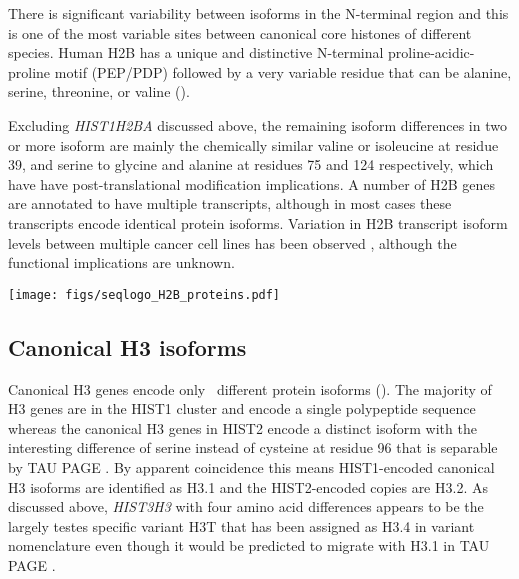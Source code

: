     There is significant variability between isoforms in the N-terminal region
    and this is one of the most variable sites between canonical
    core histones of different species.
    Human H2B has a unique and distinctive N-terminal proline-acidic-proline motif (PEP/PDP)
    followed by a very variable residue that can be alanine, serine,
    threonine, or valine ().

    Excluding \textit{HIST1H2BA} discussed above,
    the remaining isoform differences in two or more isoform are mainly the chemically
    similar valine or isoleucine at residue 39,
    and serine to glycine and alanine at residues 75 and 124 respectively,
    which have have post-translational modification implications.
    A number of H2B genes are annotated to have multiple transcripts,
    although in most cases these transcripts encode identical protein isoforms.
    Variation in H2B transcript isoform levels between multiple cancer cell
    lines has been observed \citep{Molden2015},
    although the functional implications are unknown.

    \begin{table}
      \caption{%
        Canonical H2B encoded protein isoforms.
        Upper panel shows isoform variations relative to the most numerous protein isoform
        using HGVS recommended nomenclature \citep{mutnomenclature2016}.
        For clarity, isoforms encoded by multiple transcripts of a single gene
        are distingushed by a numerical suffix (see ).
        Lower panel shows sequence logo of all isoforms aligned
        with invariant residues in grey.
      }
      \label{tab:H2B-consensus}
      
      \texttt{[image: figs/seqlogo\_H2B\_proteins.pdf]}
    \end{table}

  \subsection{Canonical H3 isoforms}
    Canonical H3 genes encode only \HThreeUniqueProteins{}~different
    protein isoforms ().
    The majority of H3 genes are in the HIST1 cluster and encode a
    single polypeptide sequence \citep{Ederveen2011}
    whereas the canonical H3 genes in HIST2 encode a distinct isoform
    with the interesting difference of serine instead of cysteine at residue 96
    that is separable by TAU PAGE \citep{FranklinZweidler1977}.
    By apparent coincidence this means HIST1-encoded canonical H3 isoforms are
    identified as H3.1 and the HIST2-encoded copies are H3.2.
    As discussed above, \textit{HIST3H3} with four amino acid differences
    appears to be the largely testes specific variant H3T
    that has been assigned as H3.4 in variant nomenclature \citep{Talbert2012}
    even though it would be predicted to migrate with H3.1 in TAU PAGE \citep{FranklinZweidler1977}.

